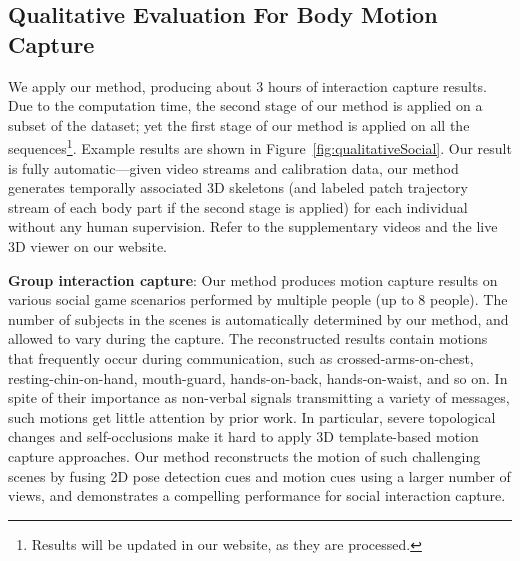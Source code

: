 
\subsection{Qualitative Evaluation For Body Motion Capture}
We apply our method, producing about 3 hours of interaction capture results. Due to the computation time, the second stage of our method is applied on a subset of the dataset; yet the first stage of our method is applied on all the sequences\footnote{Results will be updated in our website, as they are processed.}. Example results are shown in Figure~\ref{fig:qualitativeSocial}. Our result is fully automatic---given video streams and calibration data, our method generates temporally associated 3D skeletons (and labeled patch trajectory stream of each body part if the second stage is applied) for each individual without any human supervision. Refer to the supplementary videos and the live 3D viewer on our website. 

\textbf{Group interaction capture}: Our method produces motion capture results on various social game scenarios performed by multiple people (up to 8 people). The number of subjects in the scenes is automatically determined by our method, and allowed to vary during the capture. The reconstructed results contain motions that frequently occur during communication, such as crossed-arms-on-chest, resting-chin-on-hand, mouth-guard, hands-on-back, hands-on-waist, and so on. In spite of their importance as non-verbal signals transmitting a variety of messages, such motions get little attention by prior work. In particular, severe topological changes and self-occlusions make it hard to apply 3D template-based motion capture approaches. Our method reconstructs the motion of such challenging scenes by fusing 2D pose detection cues and motion cues using a larger number of views, and demonstrates a compelling performance for social interaction capture. %

